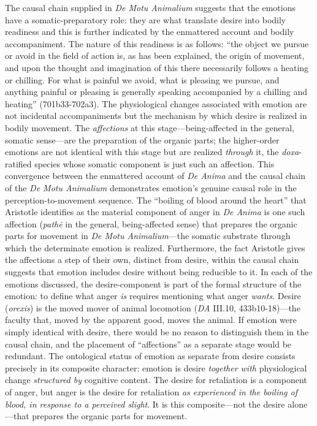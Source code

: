 The causal chain supplied in \textit{De Motu Animalium} suggests that the emotions have a somatic-preparatory role: they are what translate desire into bodily readiness and this is further indicated by the enmattered account and bodily accompaniment. The nature of this readiness is as follows: ``the object we pursue or avoid in the field of action is, as has been explained, the origin of movement, and upon the thought and imagination of this there necessarily follows a heating or chilling. For what is painful we avoid, what is pleasing we pursue, and anything painful or pleasing is generally speaking accompanied by a chilling and heating'' (701b33-702a3). The physiological changes associated with emotion are not incidental accompaniments but the mechanism by which desire is realized in bodily movement. The \textit{affections} at this stage---being-affected in the general, somatic sense---are the preparation of the organic parts; the higher-order emotions are not identical with this stage but are realized \textit{through} it, the \textit{doxa}-ratified species whose somatic component is just such an affection. This convergence between the enmattered account of \textit{De Anima} and the causal chain of the \textit{De Motu Animalium} demonstrates emotion's genuine causal role in the perception-to-movement sequence. The ``boiling of blood around the heart'' that Aristotle identifies as the material component of anger in \textit{De Anima} is one such affection (\textit{pathē} in the general, being-affected sense) that prepares the organic parts for movement in \textit{De Motu Animalium}---the somatic substrate through which the determinate emotion is realized. Furthermore, the fact Aristotle gives the affections a step of their own, distinct from desire, within the causal chain suggests that emotion includes desire without being reducible to it. In each of the emotions discussed, the desire-component is part of the formal structure of the emotion: to define what anger \textit{is} requires mentioning what anger \textit{wants}. Desire (\textit{orexis}) is the moved mover of animal locomotion (\textit{DA} III.10, 433b10-18)---the faculty that, moved by the apparent good, moves the animal. If emotion were simply identical with desire, there would be no reason to distinguish them in the causal chain, and the placement of ``affections'' as a separate stage would be redundant. The ontological status of emotion as separate from desire consists precisely in its composite character: emotion is desire \textit{together with} physiological change \textit{structured by} cognitive content. The desire for retaliation is a component of anger, but anger is the desire for retaliation \textit{as experienced in the boiling of blood, in response to a perceived slight}. It is this composite---not the desire alone---that prepares the organic parts for movement. 

